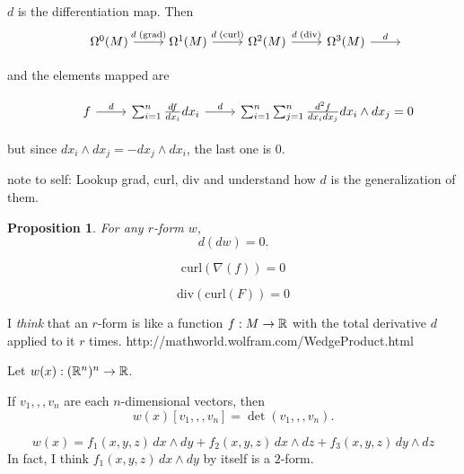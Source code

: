 \documentclass[11pt]{amsbook}
\theoremstyle{mystyle} \newtheorem{thrm}[thm]{Theorem}
\theoremstyle{mystyle} \newtheorem{defi}[thm]{Definition}
\theoremstyle{mystyle} \newtheorem{coro}[thm]{Corollary}
\theoremstyle{mystyle} \newtheorem{propo}[thm]{Proposition}
\theoremstyle{mystyle} \newtheorem{lemm}[thm]{Lemma}
\numberwithin{thm}{section}
\newcommand{\grad}{\nabla}
\begin{document}
\begin{example}
	$d$ is the differentiation map. Then
	$$\begin{tikzcd}
	 	& \Omega^0(M) \arrow[r, "d \;\text{(grad)}"] & \Omega^1(M) \arrow[r, "d \;\text{(curl)}"] & \Omega^2(M) \arrow[r, "d \;\text{(div)}"] & \Omega^3(M) \arrow[r, "d"] &\hphantom{}
	\end{tikzcd}$$

	and the elements mapped are

	$$\begin{tikzcd}
	 	& f \arrow[r, "d"] & \sum_{i=1}^{n} \frac{df}{dx_i} dx_i \arrow[r, "d"] & \sum_{i=1}^{n} \sum_{j=1}^{n} \frac{d^2f}{dx_i dx_j} dx_i \wedge dx_j = 0
	\end{tikzcd}$$

	but since $dx_i \wedge dx_j = -dx_j \wedge dx_i$, the last one is 0.

	note to self: Lookup grad, curl, div and understand how $d$ is the generalization of them.
\end{example}


\begin{propo}
    For any $r$-form $w$,
	$$d(dw) = 0.$$
\end{propo}
\begin{example}
	$$\text{curl}(\grad(f)) = 0$$
\end{example}
\begin{example}
	$$\text{div}(\text{curl}(F)) = 0$$
\end{example}

\begin{example}
	I \emph{think} that an $r$-form is like a function $f:M \to {\mathbb R}$ with the total derivative $d$ applied to it $r$ times.
	http://mathworld.wolfram.com/WedgeProduct.html
\end{example}

\begin{example}
	Let $w(x) : ({\mathbb R}^n)^n \to {\mathbb R}$.

	If $v_1,,,v_n$ are each $n$-dimensional vectors, then
	$$w(x)[v_1,,,v_n] = \det(v_1,,,v_n).$$	%
\end{example}

\begin{example}[2-forms]
	$$w(x) = f_1(x,y,z)\,dx \wedge dy + f_2(x,y,z)\,dx \wedge dz + f_3(x,y,z)\,dy \wedge dz$$
	In fact, I think $f_1(x,y,z)\,dx \wedge dy$ by itself is a $2$-form.	%
\end{example}
\end{document}
